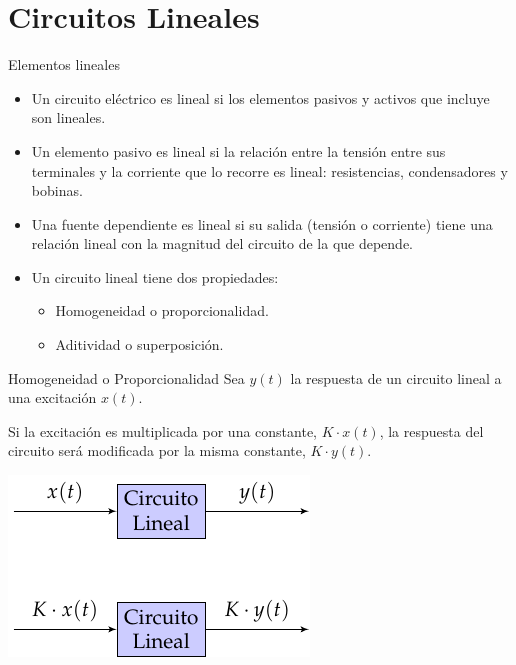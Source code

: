 \documentclass[xcolor={usenames,svgnames,dvipsnames}]{beamer}
\begin{document}
\section{Circuitos Lineales}
\label{sec:orga4bcbf0}

\begin{frame}[label={sec:orgf03ae43}]{Elementos lineales}
\begin{itemize}
\item Un circuito eléctrico es lineal si los elementos pasivos y activos que incluye son lineales.
\item Un \alert{elemento pasivo} es lineal si la relación entre la tensión entre sus terminales y la corriente que lo recorre es lineal: \alert{resistencias, condensadores y bobinas}.
\item Una \alert{fuente dependiente} es lineal si su salida (tensión o corriente) tiene una relación lineal con la magnitud del circuito de la que depende.
\item Un circuito lineal tiene dos propiedades:
\begin{itemize}
\item Homogeneidad o \alert{proporcionalidad}.
\item Aditividad o \alert{superposición}.
\end{itemize}
\end{itemize}
\end{frame}

\begin{frame}[label={sec:org62cf6cf}]{Homogeneidad o Proporcionalidad}
Sea \(y(t)\) la respuesta de un \alert{circuito lineal} a una excitación \(x(t)\). 

Si la excitación es multiplicada por una \alert{constante}, \(K \cdot x(t)\), la respuesta del circuito será modificada por la misma constante, \(K \cdot y(t)\).

\begin{center}
\includegraphics[height=0.5\textheight]{figs/proporcionalidad.pdf}
\end{center}
\end{frame}
\end{document}
